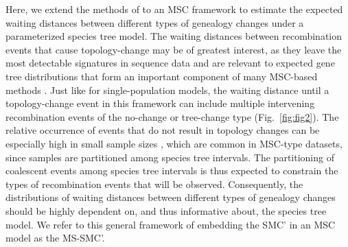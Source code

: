 \documentclass[11pt]{article}
\begin{document}



Here, we extend the methods of \citet{deng_distribution_2021} to an MSC framework
to estimate the expected waiting distances between different types of 
genealogy changes under a parameterized species tree model. 
The waiting distances between recombination events that cause topology-change 
may be of greatest interest, as they leave the most detectable signatures 
in sequence data and are relevant to expected gene tree distributions that form
an important component of many MSC-based methods \citep{
degnan2006discordance, baum_concordance_2007, knowles_estimating_2011}.
Just like for single-population models, 
the waiting distance until a topology-change event in this framework can include multiple
intervening recombination events of the no-change or tree-change type
(Fig.~\ref{fig:fig2}). 
The relative occurrence of events that do not result in topology 
changes can be especially high in small sample sizes \citep{wilton2015smc}, 
which are common in MSC-type datasets, since samples are partitioned 
among species tree intervals. 
The partitioning of 
coalescent events among species tree intervals is thus expected to constrain 
the types of recombination events that will be observed. Consequently, the
distributions of waiting distances between different types of 
genealogy changes should be highly dependent on, and thus informative about, 
the species tree model. We refer to this general framework of embedding the 
SMC' in an MSC model as the MS-SMC'.


\end{document}
